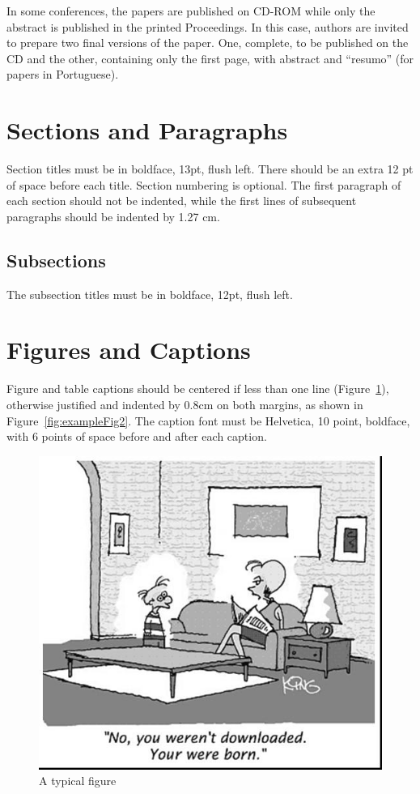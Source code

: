 \documentclass[12pt]{article}
\begin{document}
In some conferences, the papers are published on CD-ROM while only the
abstract is published in the printed Proceedings. In this case, authors are
invited to prepare two final versions of the paper. One, complete, to be
published on the CD and the other, containing only the first page, with
abstract and ``resumo'' (for papers in Portuguese).

\section{Sections and Paragraphs}

Section titles must be in boldface, 13pt, flush left. There should be an extra
12 pt of space before each title. Section numbering is optional. The first
paragraph of each section should not be indented, while the first lines of
subsequent paragraphs should be indented by 1.27 cm.

\subsection{Subsections}

The subsection titles must be in boldface, 12pt, flush left.

\section{Figures and Captions}\label{sec:figs}


Figure and table captions should be centered if less than one line
(Figure~\ref{fig:exampleFig1}), otherwise justified and indented by 0.8cm on
both margins, as shown in Figure~\ref{fig:exampleFig2}. The caption font must
be Helvetica, 10 point, boldface, with 6 points of space before and after each
caption.

\begin{figure}[ht]
\centering
\includegraphics[width=.5\textwidth]{fig1.jpg}
\caption{A typical figure}
\label{fig:exampleFig1}
\end{figure}
\end{document}
